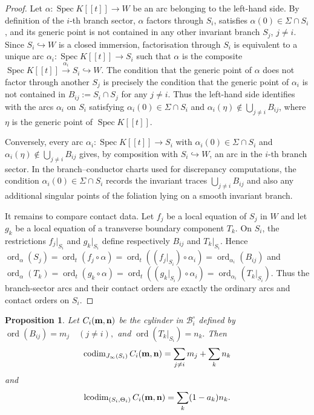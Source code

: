 \documentclass[11pt]{amsart}
\numberwithin{equation}{section}
\theoremstyle{plain}
\newtheorem{Proposition}[Theorem]{Proposition}
\theoremstyle{definition}
\newcommand{\Spec}{\operatorname{Spec}}
\newcommand{\codim}{\operatorname{codim}}
\newcommand{\ord}{\operatorname{ord}}
\newcommand{\lcodim}{\operatorname{lcodim}}
\newcommand{\cB}{\mathcal B}
\begin{document}
\begin{proof}
Let $\alpha:\Spec K[[t]]\to W$ be an arc belonging to the left-hand side. By definition of the $i$-th branch sector, $\alpha$ factors through $S_i$, satisfies $\alpha(0)\in\Sigma\cap S_i$, and its generic point is not contained in any other invariant branch $S_j$, $j\ne i$. Since $S_i\hookrightarrow W$ is a closed immersion, factorisation through $S_i$ is equivalent to a unique arc $\alpha_i:\Spec K[[t]]\to S_i$ such that $\alpha$ is the composite $\Spec K[[t]]\xrightarrow{\alpha_i}S_i\hookrightarrow W$. The condition that the generic point of $\alpha$ does not factor through another $S_j$ is precisely the condition that the generic point of $\alpha_i$ is not contained in $B_{ij}:=S_i\cap S_j$ for any $j\ne i$. Thus the left-hand side identifies with the arcs $\alpha_i$ on $S_i$ satisfying $\alpha_i(0)\in\Sigma\cap S_i$ and $\alpha_i(\eta)\notin\bigcup_{j\ne i}B_{ij}$, where $\eta$ is the generic point of $\Spec K[[t]]$.

Conversely, every arc $\alpha_i:\Spec K[[t]]\to S_i$ with $\alpha_i(0)\in\Sigma\cap S_i$ and $\alpha_i(\eta)\notin\bigcup_{j\ne i}B_{ij}$ gives, by composition with $S_i\hookrightarrow W$, an arc in the $i$-th branch sector. In the branch--conductor charts used for discrepancy computations, the condition $\alpha_i(0)\in\Sigma\cap S_i$ records the invariant traces $\bigcup_{j\ne i}B_{ij}$ and also any additional singular points of the foliation lying on a smooth invariant branch.

It remains to compare contact data.  Let $f_j$ be a local equation of $S_j$ in $W$ and let $g_k$ be a local equation of a transverse boundary component $T_k$. On $S_i$, the restrictions $f_j|_{S_i}$ and $g_k|_{S_i}$ define respectively $B_{ij}$ and $T_k|_{S_i}$. Hence $\ord_\alpha(S_j)=\ord_t(f_j\circ\alpha)=\ord_t((f_j|_{S_i})\circ\alpha_i)=\ord_{\alpha_i}(B_{ij})$ and $\ord_\alpha(T_k)=\ord_t(g_k\circ\alpha)=\ord_t((g_k|_{S_i})\circ\alpha_i)=\ord_{\alpha_i}(T_k|_{S_i})$. Thus the branch-sector arcs and their contact orders are exactly the ordinary arcs and contact orders on $S_i$.
\end{proof}

\begin{Proposition}
\label{prop:monomial-codim}
Let $C_i({\bf m},{\bf n})$ be the cylinder in $\cB_i^\circ$ defined by
$
\ord(B_{ij})=m_j \quad (j\ne i),
 $ and  $
\ord(T_k|_{S_i})=n_k.
$
Then
\[
\codim_{J_\infty(S_i)}C_i({\bf m},{\bf n})=\sum_{j\ne i}m_j+\sum_k n_k
\]
and
\[
\lcodim_{(S_i,\Theta_i)}C_i({\bf m},{\bf n})=
\sum_k(1-a_k)n_k.
\]
\end{Proposition}
\end{document}
